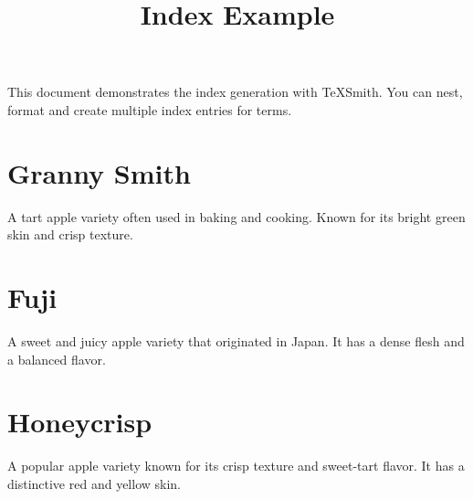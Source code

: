 \documentclass[a6paper,twoside]{article}
\title{Index Example}
\author{}\date{}
\begin{document}
\maketitle
This document demonstrates the index generation with TeXSmith. You can nest, format and create multiple index entries for terms.
\section{Granny Smith}
A tart apple variety often used in baking and cooking. Known for its bright green skin and crisp texture.
\clearpage
\section{Fuji}
A sweet and juicy apple variety that originated in Japan. It has a dense flesh and a balanced flavor.

\clearpage
\section{Honeycrisp}
A popular apple variety known for its crisp texture and sweet-tart flavor. It has a distinctive red and yellow skin.


\printindex
\end{document}

